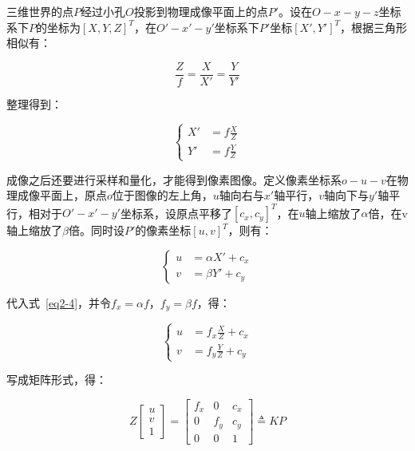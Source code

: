 三维世界的点$P$经过小孔$O$投影到物理成像平面上的点$P'$。设在$O-x-y-z$坐标系下$P$的坐标为$\left[X,Y,Z\right]^T$，在$O'-x'-y'$坐标系下$P'$坐标$\left[X',Y'\right]^T$，根据三角形相似有：

\begin{equation}\label{eq2-2}
	\frac{Z}{f} = \frac{X}{X'} = \frac{Y}{Y'}
\end{equation}

整理得到：

\begin{equation}\label{eq2-3}
	\left\{ \begin{aligned}
		X' & = f \frac{X}{Z} \\
		Y' & = f \frac{Y}{Z} 
		\end{aligned}
	\right.
\end{equation}

成像之后还要进行采样和量化，才能得到像素图像。定义像素坐标系$o-u-v$在物理成像平面上，原点$o$位于图像的左上角，$u$轴向右与$x'$轴平行，$v$轴向下与$y'$轴平行，相对于$O'-x'-y'$坐标系，设原点平移了$\left[c_x,c_y\right]^T$，在$u$轴上缩放了$\alpha$倍，在v轴上缩放了$\beta$倍。同时设$P'$的像素坐标$\left[u,v\right]^T$，则有：

\begin{equation}\label{eq2-4}
	\left\{ \begin{aligned}
		u & = \alpha X' + c_x \\
		v & = \beta Y' +  c_y 
		\end{aligned}
	\right.
\end{equation}

代入式~\eqref{eq2-4}，并令$f_x=\alpha f$，$f_y=\beta f$，得：

\begin{equation}\label{eq2-5}
	\left\{ \begin{aligned}
		u & = f_x \frac{X}{Z} + c_x \\
		v & = f_y \frac{Y}{Z} + c_y 
		\end{aligned}
	\right.
\end{equation}

写成矩阵形式，得：

\begin{equation}\label{eq2-6}
	Z \left[\begin{array}{c}u \\v \\ 1\end{array}\right] = \left[\begin{matrix}f_x & 0 & c_x \\ 0 & f_y & c_y \\ 0 & 0 & 1\end{matrix}\right] \triangleq K P
\end{equation}


